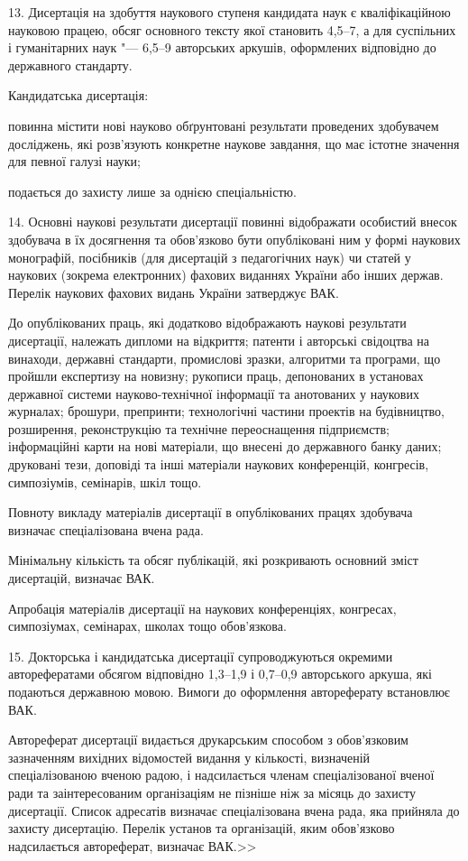 \documentclass{vakaref}
\theoremstyle{plain}
\theoremstyle{definition}
\theoremstyle{remark}
\begin{document}
13. Дисертація на здобуття наукового ступеня кандидата наук є
кваліфікаційною науковою працею, обсяг основного тексту якої
становить 4,5--7, а для суспільних і гуманітарних наук "--- 6,5--9
авторських аркушів, оформлених відповідно до державного стандарту.

Кандидатська дисертація:

повинна містити нові науково обґрунтовані результати проведених
здобувачем досліджень, які розв'язують конкретне наукове завдання,
що має істотне значення для певної галузі науки;

подається до захисту лише за однією спеціальністю.

14. Основні наукові результати дисертації повинні відображати
особистий внесок здобувача в їх досягнення та обов'язково бути
опубліковані ним у формі наукових монографій, посібників (для
дисертацій з педагогічних наук) чи статей у наукових (зокрема
електронних) фахових виданнях України або інших держав. Перелік
наукових фахових видань України затверджує ВАК.

До опублікованих праць, які додатково відображають наукові
результати дисертації, належать дипломи на відкриття; патенти і
авторські свідоцтва на винаходи, державні стандарти, промислові
зразки, алгоритми та програми, що пройшли експертизу на новизну;
рукописи праць, депонованих в установах державної системи
науково-технічної інформації та анотованих у наукових журналах;
брошури, препринти; технологічні частини проектів на будівництво,
розширення, реконструкцію та технічне переоснащення підприємств;
інформаційні карти на нові матеріали, що внесені до державного
банку даних; друковані тези, доповіді та інші матеріали наукових
конференцій, конгресів, симпозіумів, семінарів, шкіл тощо.

Повноту викладу матеріалів дисертації в опублікованих працях
здобувача визначає спеціалізована вчена рада.

Мінімальну кількість та обсяг публікацій, які розкривають основний
зміст дисертацій, визначає ВАК.

Апробація матеріалів дисертації на наукових конференціях,
конгресах, симпозіумах, семінарах, школах тощо обов'язкова.

15. Докторська і кандидатська дисертації супроводжуються окремими
авторефератами обсягом відповідно 1,3--1,9 і 0,7--0,9 авторського
аркуша, які подаються державною мовою. Вимоги до оформлення
автореферату встановлює ВАК.

Автореферат дисертації видається друкарським способом з
обов'язковим зазначенням вихідних відомостей видання у кількості,
визначеній спеціалізованою вченою радою, і надсилається членам
спеціалізованої вченої ради та заінтересованим організаціям не
пізніше ніж за місяць до захисту дисертації. Список адресатів
визначає спеціалізована вчена рада, яка прийняла до захисту
дисертацію. Перелік установ та організацій, яким обов'язково
надсилається автореферат, визначає ВАК.>>
\end{document}
